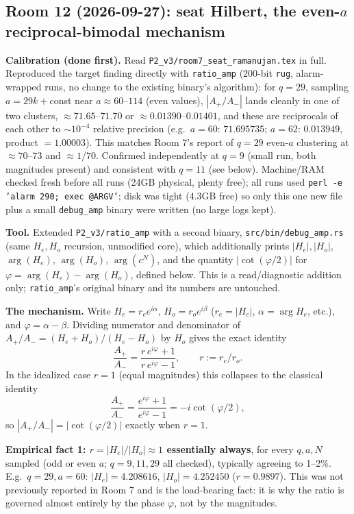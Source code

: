 \subsection*{Room 12 (2026-09-27): seat Hilbert, the even-$a$ reciprocal-bimodal mechanism}

\textbf{Calibration (done first).} Read \texttt{P2\_v3/room7\_seat\_ramanujan.tex} in full.
Reproduced the target finding directly with \texttt{ratio\_amp} (200-bit \texttt{rug}, alarm-wrapped
runs, no change to the existing binary's algorithm): for $q=29$, sampling $a=29k+$const near
$a\approx60$--$114$ (even values), $|A_+/A_-|$ lands cleanly in one of two clusters,
$\approx71.65$--$71.70$ or $\approx0.01390$--$0.01401$, and these are reciprocals of each other to
$\sim\!10^{-4}$ relative precision (e.g.\ $a=60$: $71.695735$; $a=62$: $0.013949$, product
$=1.00003$). This matches Room 7's report of $q=29$ even-$a$ clustering at $\approx70$--$73$ and
$\approx1/70$. Confirmed independently at $q=9$ (small run, both magnitudes present) and consistent
with $q=11$ (see below). Machine/RAM checked fresh before all runs (24GB physical, plenty free);
all runs used \texttt{perl -e 'alarm 290; exec @ARGV'}; disk was tight (4.3GB free) so only this
one new file plus a small \texttt{debug\_amp} binary were written (no large logs kept).

\textbf{Tool.} Extended \texttt{P2\_v3/ratio\_amp} with a second binary,
\texttt{src/bin/debug\_amp.rs} (same $H_e,H_o$ recursion, unmodified core), which additionally
prints $|H_e|,|H_o|$, $\arg(H_e)$, $\arg(H_o)$, $\arg(c^N)$, and the quantity
$|\cot(\varphi/2)|$ for $\varphi=\arg(H_e)-\arg(H_o)$, defined below. This is a read/diagnostic
addition only; \texttt{ratio\_amp}'s original binary and its numbers are untouched.

\textbf{The mechanism.} Write $H_e = r_e e^{i\alpha}$, $H_o = r_o e^{i\beta}$ ($r_e=|H_e|$,
$\alpha=\arg H_e$, etc.), and $\varphi=\alpha-\beta$. Dividing numerator and denominator of
$A_+/A_- = (H_e+H_o)/(H_e-H_o)$ by $H_o$ gives the exact identity
\[
\frac{A_+}{A_-} = \frac{r\,e^{i\varphi}+1}{r\,e^{i\varphi}-1}, \qquad r := r_e/r_o .
\]
In the idealized case $r=1$ (equal magnitudes) this collapses to the classical identity
\[
\frac{A_+}{A_-} = \frac{e^{i\varphi}+1}{e^{i\varphi}-1} = -i\cot(\varphi/2),
\]
so $|A_+/A_-| = |\cot(\varphi/2)|$ exactly when $r=1$.

\textbf{Empirical fact 1: $r=|H_e|/|H_o|\approx1$ essentially always}, for every $q,a,N$ sampled
(odd or even $a$; $q=9,11,29$ all checked), typically agreeing to 1--2\%. E.g.\ $q=29,a=60$:
$|H_e|=4.208616$, $|H_o|=4.252450$ ($r=0.9897$). This was not previously reported in Room 7 and
is the load-bearing fact: it is why the ratio is governed almost entirely by the phase $\varphi$,
not by the magnitudes.

